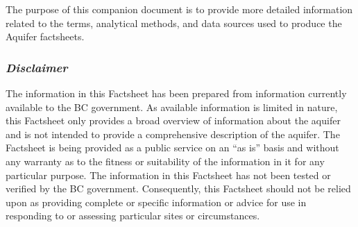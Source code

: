 \documentclass[11pt,]{article}
\title{}
\author{}
\date{}
\begin{document}
 \renewcommand{\familydefault}{\sfdefault}


 

\def\UrlFont{\bfseries}


\vspace{1.5cm}

The purpose of this companion document is to provide more detailed
information related to the terms, analytical methods, and data sources
used to produce the Aquifer factsheets.

\subsubsection{\texorpdfstring{\emph{Disclaimer}}{Disclaimer}}\label{disclaimer}

\vspace{-4mm}

The information in this Factsheet has been prepared from information
currently available to the BC government. As available information is
limited in nature, this Factsheet only provides a broad overview of
information about the aquifer and is not intended to provide a
comprehensive description of the aquifer. The Factsheet is being
provided as a public service on an ``as is'' basis and without any
warranty as to the fitness or suitability of the information in it for
any particular purpose. The information in this Factsheet has not been
tested or verified by the BC government. Consequently, this Factsheet
should not be relied upon as providing complete or specific information
or advice for use in responding to or assessing particular sites or
circumstances.
\end{document}
